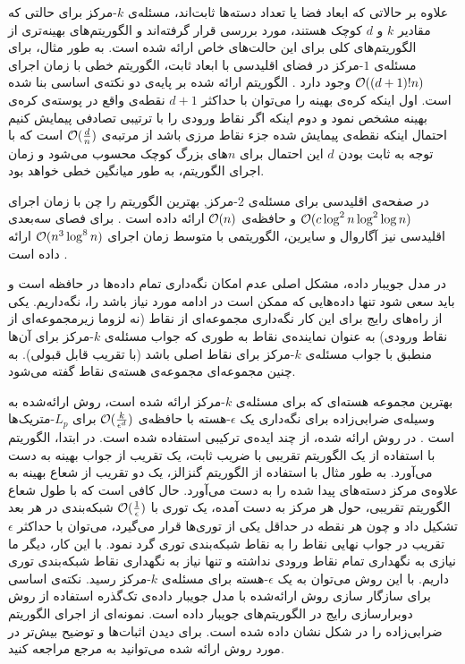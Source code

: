 علاوه بر حالاتی که ابعاد فضا یا تعداد دسته‌ها ثابت‌اند، مسئله‌ی $k$-مرکز برای حالتی که مقادیر $k$ و $d$ کوچک هستند، مورد بررسی قرار گرفته‌اند و الگوریتم‌های بهینه‌تری از الگوریتم‌های کلی برای این حالت‌های خاص ارائه شده است. به طور مثال، برای مسئله‌ی $1$-مرکز در فضای اقلیدسی با ابعاد ثابت، الگوریتم خطی با زمان اجرای $\mathcal{O}((d+1)! n)$ وجود دارد . الگوریتم ارائه شده بر پایه‌ی دو نکته‌ی اساسی بنا شده است. اول اینکه کره‌ی بهینه را می‌توان با حداکثر $d+1$ نقطه‌ی واقع در پوسته‌ی کره‌ی بهینه مشخص نمود و دوم اینکه اگر نقاط ورودی را با ترتیبی تصادفی پیمایش‌ کنیم احتمال اینکه نقطه‌ی پیمایش شده جزء نقاط مرزی باشد از مرتبه‌ی $\mathcal{O}(\frac{d}{n})$ است که با توجه به ثابت بودن $d$ این احتمال برای $n$‌های بزرگ کوچک محسوب می‌شود و زمان اجرای الگوریتم، به طور میانگین خطی خواهد بود. 

در صفحه‌ی اقلیدسی‌ برای مسئله‌ی $2$-مرکز, بهترین الگوریتم را چن   با زمان اجرای $\mathcal{O}(c \log^2{n} \log^2{\log{n}})$ و حافظه‌ی $\mathcal{O}(n)$ ارائه داده است . برای فصای سه‌بعدی اقلیدسی نیز آگاروال و سایرین، الگوریتمی با متوسط‌ زمان اجرای $\mathcal{O}(n^3\log^8{n})$ ارائه داده است .


در مدل جویبار داده، مشکل اصلی عدم امکان نگه‌داری تمام داده‌ها در حافظه است و باید سعی شود تنها داده‌هایی که ممکن است در ادامه مورد نیاز باشد را، نگه‌داریم. یکی از راه‌های رایج برای این کار نگه‌داری مجموعه‌ای از‌ نقاط (نه لزوما زیرمجموعه‌ای از نقاط‌ ورودی) به عنوان نماینده‌ی نقاط‌ به طوری که جواب مسئله‌ی $k$-مرکز برای آن‌ها منطبق‌ با جواب مسئله‌ی $k$-مرکز‌ برای نقاط‌ اصلی باشد (با تقریب قابل قبولی). به چنین مجموعه‌ای مجموعه‌ی هسته‌ی نقاط‌ گفته می‌شود. 

بهترین مجموعه‌ هسته‌ای که برای مسئله‌ی $k$-مرکز‌ ارائه شده است، روش ارائه‌شده به وسیله‌ی ضرابی‌زاده برای نگه‌داری یک $\epsilon$-هسته با حافظه‌ی $\mathcal{O}(\frac{k}{\epsilon^d})$ برای $L_p$-متریک‌ها است . در روش ارائه شده، از چند ایده‌ی ترکیبی استفاده شده است. در ابتدا، الگوریتم با استفاده از یک الگوریتم تقریبی با ضریب ثابت، یک تقریب از جواب بهینه به دست می‌آورد. به طور مثال با استفاده از‌ الگوریتم گنزالز، یک دو تقریب از شعاع بهینه به علاوه‌ی مرکز‌ دسته‌های پیدا شده را به دست می‌آورد. حال کافی است که با طول شعاع الگوریتم تقریبی، حول هر مرکز‌ به دست آمده، یک توری با $\mathcal{O}(\frac{1}{\epsilon})$ شبکه‌بندی در هر بعد تشکیل داد و چون هر نقطه در حداقل یکی از توری‌ها قرار می‌گیرد، می‌توان با حداکثر $\epsilon$ تقریب در جواب نهایی نقاط را به نقاط شبکه‌بندی توری گرد نمود. با این کار، دیگر ما نیازی به نگهداری تمام نقاط ورودی نداشته و تنها نیاز به نگهداری نقاط شبکه‌بندی توری داریم. با این‌ روش می‌توان به یک $\epsilon$-هسته برای مسئله‌ی $k$-مرکز رسید. نکته‌ی اساسی برای سازگار سازی روش ارائه‌شده با مدل جویبار داده‌ی تک‌گذره استفاده از روش دوبرارسازی رایج در الگوریتم‌های جویبار داده است. نمونه‌ای از اجرای الگوریتم ضرابی‌زاده را در شکل  نشان داده شده است. برای دیدن اثبات‌ها و توضیح بیش‌تر در مورد روش ارائه شده می‌توانید به مرجع  مراجعه کنید.

